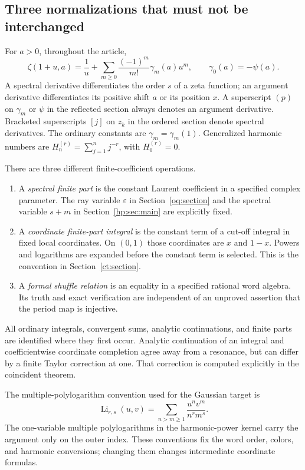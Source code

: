 \documentclass[11pt,a4paper]{article}
\numberwithin{equation}{section}
\theoremstyle{definition}
\theoremstyle{remark}
\begin{document}
\subsection{Three normalizations that must not be interchanged}

For $a>0$, throughout the article,
\[
 \zeta(1+u,a)=\frac1u+
       \sum_{m\ge0}\frac{(-1)^m}{m!}\gamma_m(a)u^m,
 \qquad \gamma_0(a)=-\psi(a).
\]
A spectral derivative differentiates the order $s$ of a zeta function;
an argument derivative differentiates its positive shift $a$ or its
position $x$. A superscript $(p)$ on $\gamma_m$ or $\psi$ in the
reflected section always denotes an argument derivative. Bracketed
superscripts $[j]$ on $z_k$ in the ordered section denote spectral
derivatives. The ordinary constants are $\gamma_m=\gamma_m(1)$.
Generalized harmonic numbers are
$H_n^{(r)}=\sum_{j=1}^n j^{-r}$, with $H_0^{(r)}=0$.

There are three different finite-coefficient operations.
\begin{enumerate}
\item A \emph{spectral finite part} is the constant Laurent coefficient
in a specified complex parameter. The ray variable $\varepsilon$ in
Section~\ref{oq:section} and the spectral variable $s+m$ in
Section~\ref{hp:sec:main} are explicitly fixed.
\item A \emph{coordinate finite-part integral} is the constant term of
a cut-off integral in fixed local coordinates. On $(0,1)$ those
coordinates are $x$ and $1-x$. Powers and logarithms are expanded before
the constant term is selected. This is the convention in
Section~\ref{ct:section}.
\item A \emph{formal shuffle relation} is an equality in a specified
rational word algebra. Its truth and exact verification are independent
of an unproved assertion that the period map is injective.
\end{enumerate}
All ordinary integrals, convergent sums, analytic continuations, and
finite parts are identified where they first occur. Analytic continuation
of an integral and coefficientwise coordinate completion agree away
from a resonance, but can differ by a finite Taylor correction at one.
That correction is computed explicitly in the coincident theorem.

The multiple-polylogarithm convention used for the Gaussian target is
\[
 \operatorname{Li}_{r,s}(u,v)
 =\sum_{n>m\ge1}\frac{u^nv^m}{n^rm^s}.
\]
The one-variable multiple polylogarithms in the harmonic-power kernel
carry the argument only on the outer index. These conventions fix the
word order, colors, and harmonic conversions; changing them changes
intermediate coordinate formulas.
\end{document}
